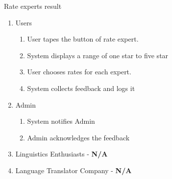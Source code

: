 \item Rate experts result 
	\begin{enumerate}[{\bf VP1.}]
		\item Users
		\begin{enumerate}[{\bf 1.}]
			\item User tapes the button of rate expert.
			\item System displays a range of one star to five star
			\item User chooses rates for each expert.
			\item System collects feedback and logs it
		\end{enumerate}
		\item Admin
		\begin{enumerate}[{\bf 6.}]
			\item System notifies Admin
			\item Admin acknowledges the feedback
		\end{enumerate}
		\item Linguistics Enthusiasts - \textbf{N/A}
		\item Language Translator Company - \textbf{N/A}
	\end{enumerate}